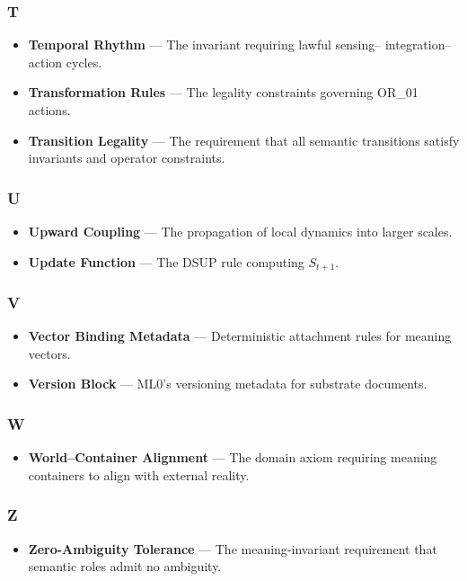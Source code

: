 \subsubsection*{T}
\begin{itemize}
    \item \textbf{Temporal Rhythm} — The invariant requiring lawful sensing–
    integration–action cycles.

    \item \textbf{Transformation Rules} — The legality constraints governing
    OR\_01 actions.

    \item \textbf{Transition Legality} — The requirement that all semantic
    transitions satisfy invariants and operator constraints.
\end{itemize}


\subsubsection*{U}
\begin{itemize}
    \item \textbf{Upward Coupling} — The propagation of local dynamics into
    larger scales.

    \item \textbf{Update Function} — The DSUP rule computing $S_{t+1}$.
\end{itemize}


\subsubsection*{V}
\begin{itemize}
    \item \textbf{Vector Binding Metadata} — Deterministic attachment rules for
    meaning vectors.

    \item \textbf{Version Block} — ML0’s versioning metadata for substrate
    documents.
\end{itemize}


\subsubsection*{W}
\begin{itemize}
    \item \textbf{World–Container Alignment} — The domain axiom requiring meaning
    containers to align with external reality.
\end{itemize}


\subsubsection*{Z}
\begin{itemize}
    \item \textbf{Zero-Ambiguity Tolerance} — The meaning‑invariant requirement
    that semantic roles admit no ambiguity.
\end{itemize}

